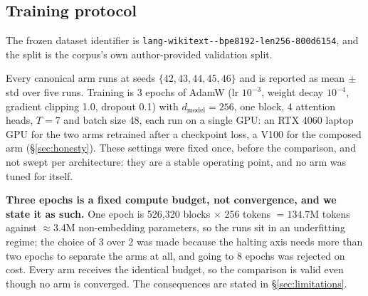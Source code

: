 \subsection{Training protocol}
\label{sec:protocol}

The frozen dataset identifier is
\texttt{lang-\allowbreak wikitext--\allowbreak bpe8192-\allowbreak len256-\allowbreak 800d6154}, and the split is the
corpus's own author-provided validation split.

Every canonical arm runs at seeds $\{42,43,44,45,46\}$ and is reported as
mean$\,\pm\,$std over five runs. Training is 3 epochs of AdamW (lr $10^{-3}$,
weight decay $10^{-4}$, gradient clipping 1.0, dropout 0.1) with
$d_{\text{model}} = 256$, one block, 4 attention heads, $T = 7$ and batch size 48,
each run on a single GPU: an RTX 4060 laptop GPU for the two arms retrained after
a checkpoint loss, a V100 for the composed arm (\S\ref{sec:honesty}). These
settings were fixed once, before the comparison, and
not swept per architecture: they are a stable operating point, and no arm was tuned
for itself.

\textbf{Three epochs is a fixed compute budget, not convergence, and we state it
as such.} One epoch is 526{,}320 blocks $\times$ 256 tokens $= 134.7$M tokens
against $\approx$3.4M non-embedding parameters, so the runs sit in an underfitting
regime; the choice of 3 over 2 was made because the halting axis needs more than
two epochs to separate the arms at all, and going to 8 epochs was rejected on cost.
Every arm receives the identical budget, so the comparison is valid even though no
arm is converged. The consequences are stated in \S\ref{sec:limitations}.

